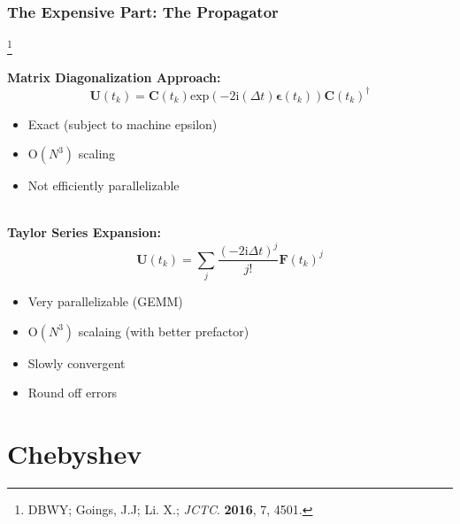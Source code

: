 \documentclass{beamer}
\newcommand{\bpar}[1]{\left( #1 \right)}                  %
\renewcommand{\exp}[1]{\mathrm{exp}\bpar{#1}}
\newcommand\blfootnote[1]{%
  \begingroup
  \renewcommand\thefootnote{}\footnote{#1}%
  \addtocounter{footnote}{-1}%
  \endgroup
}
\begin{document}
\begin{frame}
\frametitle{The Expensive Part: The Propagator}
\blfootnote{DBWY; Goings, J.J; Li. X.; \emph{JCTC}. \textbf{2016}, 7, 4501.}
\textbf{Matrix Diagonalization Approach:}
\begin{equation*}
\mathbf{U}(t_k) = \mathbf{C}(t_k) \exp{-2\mathrm{i}(\Delta t)\boldsymbol{\epsilon}(t_k)} \mathbf{C}(t_k)^\dagger
\end{equation*}
\vspace{-10pt}
\begin{itemize}
  \color{green}
  \item Exact (subject to machine epsilon)
\end{itemize}
\begin{itemize}
  \color{red}
  \item O$(N^3)$ scaling
  \item Not efficiently parallelizable
\end{itemize}
~\\

\textbf{Taylor Series Expansion:}
\begin{equation*}
\mathbf{U}(t_k) = \sum_{j} \frac{(-2\mathrm{i}\Delta t)^j}{j!}\mathbf{F}(t_k)^j
\end{equation*}
\begin{itemize}
  \color{green}
  \item Very parallelizable (GEMM)
  \item O$(N^3)$ scalaing (with better prefactor)
\end{itemize}
\begin{itemize}
  \color{red}
  \item Slowly convergent 
  \item Round off errors
\end{itemize}

\end{frame}

\section{Chebyshev}
\end{document}
